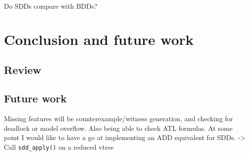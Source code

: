 \documentclass[11pt]{report}
\begin{document}
Do SDDs compare with BDDs?

\chapter{Conclusion and future work}

\section{Review}

\section{Future work}

Missing features will be counterexample/witness generation, and checking for deadlock or model overflow. Also being able to check ATL formulas.
At some point I would like to have a go at implementing an ADD equivalent for SDDs.
-> Call \texttt{sdd\_apply()} on a reduced vtree
\end{document}
